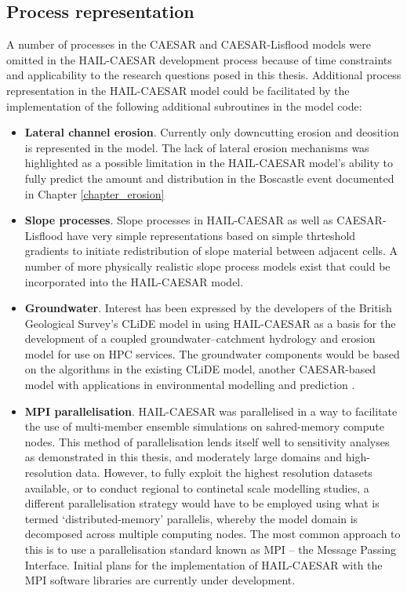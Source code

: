 \subsection{Process representation}
A number of processes in the CAESAR and CAESAR-Lisflood models were omitted in the HAIL-CAESAR development process because of time constraints and applicability to the research questions posed in this thesis. Additional process representation in the HAIL-CAESAR model could be facilitated by the implementation of the following additional subroutines in the model code:

\begin{itemize}
\item \textbf{Lateral channel erosion}. Currently only downcutting erosion and deosition is represented in the model. The lack of lateral erosion mechanisms was highlighted as a possible limitation in the HAIL-CAESAR model's ability to fully predict the amount and distribution in the Boscastle event documented in Chapter \ref{chapter_erosion}

\item \textbf{Slope processes}. Slope processes in HAIL-CAESAR as well as CAESAR-Lisflood have very simple representations based on simple thrteshold gradients to initiate redistribution of slope material between adjacent cells. A number of more physically realistic slope process models exist that could be incorporated into the HAIL-CAESAR model.

\item \textbf{Groundwater}. Interest has been expressed by the developers of the British Geological Survey's CLiDE model in using HAIL-CAESAR as a basis for the development of a coupled groundwater--catchment hydrology and erosion model for use on HPC services. The groundwater components would be based on the algorithms in the existing CLiDE model, another CAESAR-based model with applications in environmental modelling and prediction \citep{e.g. BARkwith...Nene}.

\item \textbf{MPI parallelisation}. HAIL-CAESAR was parallelised in a way to facilitate the use of multi-member ensemble simulations on sahred-memory compute nodes. This method of parallelisation lends itself well to sensitivity analyses as demonstrated in this thesis, and moderately large domains and high-resolution data. However, to fully exploit the highest resolution datasets available, or to conduct regional to continetal scale modelling studies, a different parallelisation strategy would have to be employed using what is termed `distributed-memory' parallelis, whereby the model domain is decomposed across multiple computing nodes. The most common approach to this is to use a parallelisation standard known as MPI -- the Message Passing Interface. Initial plans for the implementation of HAIL-CAESAR with the MPI software libraries are currently under development. 


\end{itemize}
